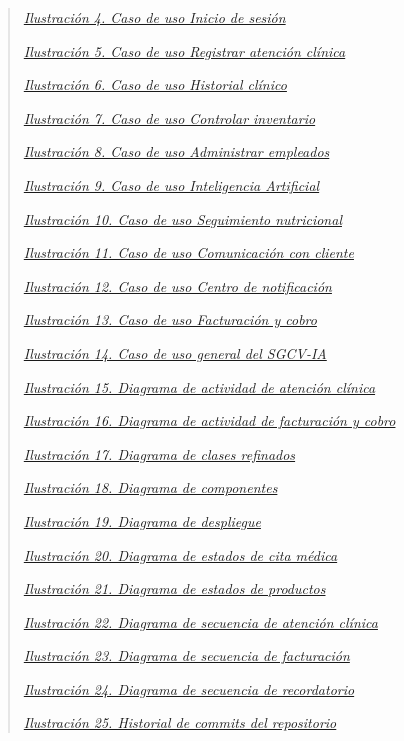 \documentclass[
]{article}
\begin{document}
\begin{quote}
\hyperref[fig31]{\emph{Ilustración 4. Caso de uso Inicio de sesión}}

\hyperref[fig32]{\emph{Ilustración 5. Caso de uso Registrar atención clínica}}

\hyperref[fig33]{\emph{Ilustración 6. Caso de uso Historial clínico}}

\hyperref[fig34]{\emph{Ilustración 7. Caso de uso Controlar inventario}}

\hyperref[fig35]{\emph{Ilustración 8. Caso de uso Administrar empleados}}

\hyperref[fig36]{\emph{Ilustración 9. Caso de uso Inteligencia Artificial}}

\hyperref[fig37]{\emph{Ilustración 10. Caso de uso Seguimiento nutricional}}

\hyperref[fig38]{\emph{Ilustración 11. Caso de uso Comunicación con cliente}}

\hyperref[fig39]{\emph{Ilustración 12. Caso de uso Centro de notificación}}

\hyperref[fig39b]{\emph{Ilustración 13. Caso de uso Facturación y cobro}}

\hyperref[fig40]{\emph{Ilustración 14. Caso de uso general del SGCV-IA}}

\hyperref[fig41]{\emph{Ilustración 15. Diagrama de actividad de atención clínica}}

\hyperref[fig42]{\emph{Ilustración 16. Diagrama de actividad de facturación y cobro}}

\hyperref[fig43]{\emph{Ilustración 17. Diagrama de clases refinados}}

\hyperref[fig44]{\emph{Ilustración 18. Diagrama de componentes}}

\hyperref[fig45]{\emph{Ilustración 19. Diagrama de despliegue}}

\hyperref[fig46]{\emph{Ilustración 20. Diagrama de estados de cita médica}}

\hyperref[fig47]{\emph{Ilustración 21. Diagrama de estados de productos}}

\hyperref[fig48]{\emph{Ilustración 22. Diagrama de secuencia de atención clínica}}

\hyperref[fig49]{\emph{Ilustración 23. Diagrama de secuencia de facturación}}

\hyperref[fig50]{\emph{Ilustración 24. Diagrama de secuencia de recordatorio}}

\hyperref[_bookmark115]{\emph{Ilustración 25. Historial de commits del repositorio}}

\end{quote}
\end{document}
